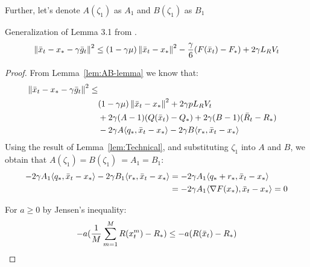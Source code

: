 Further, let's denote $A(\zeta_1)$ as $A_1$ and $B(\zeta_1)$ as $B_1$
\begin{lemma} \label{lem:main}
    Generalization of Lemma 3.1 from \cite{Stich}.
    \begin{align}
        \begin{split}
            \norm{\bar{x}_t - x_* - \gamma \bar{g}_t}^2 
            \leq (1 - \gamma \mu)\norm{\bar{x}_t - x_*}^2  - \frac{\gamma}{6} (F(\bar{x}_t) - F_*) + 2 \gamma L_R V_t
        \end{split}
    \end{align}
\end{lemma}
\begin{proof}
    From Lemma~\ref{lem:AB-lemma} we know that:
    \begin{align}
        \begin{split}
            \norm{\bar{x}_t - x_* - \gamma \bar{g}_t}^2 \leq \\
            &(1 - \gamma \mu)\norm{\bar{x}_t - x_*}^2 + 2 \gamma p L_R V_t \\
            &+ 2\gamma (A - 1)(Q(\bar{x}_t) - Q_*)
            + 2\gamma (B - 1)(\bar{R}_t - R_*) \\
            &- 2\gamma A \inner{q_*}{\bar{x}_t - x_*}
            - 2\gamma B \inner{r_*}{\bar{x}_t - x_*} \label{eq:main}
        \end{split}
    \end{align}
    Using the result of Lemma~\ref{lem:Technical}, and substituting $\zeta_1$ into $A$ and $B$, we obtain that 
    $A(\zeta_1) = B(\zeta_1) \ = A_1 = B_1$:
    \begin{align}
        - 2\gamma A_1 \inner{q_*}{\bar{x}_t - x_*} - 2\gamma B_1 \inner{r_*}{\bar{x}_t - x_*} 
        &= - 2\gamma A_1 \inner{q_* + r_*}{\bar{x}_t - x_*} \\
        &= - 2\gamma A_1 \inner{\nabla F(x_*)}{\bar{x}_t - x_*} = 0 \label{eq:zero}
    \end{align}

    For $a \geq 0$ by Jensen's inequality:
    \begin{align}
        -a (\fsumm{m=1}{M}{R(x^m_t}) - R_*) \leq -a (R(\bar{x}_t) - R_*) \label{eq:jensen'} 
    \end{align}
    

\end{proof}
